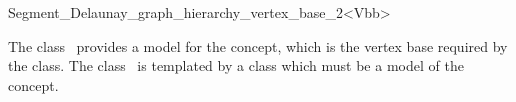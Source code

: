 


\begin{ccRefClass}{Segment_Delaunay_graph_hierarchy_vertex_base_2<Vbb>}


\ccDefinition

The class \ccRefName\ provides a model for the
 concept, which is the
vertex base required by the
 class. The class
\ccRefName\ is templated by a class  which must be a model
of the  concept.


\ccInheritsFrom
{}

\ccIsModel
{}






\end{ccRefClass}
